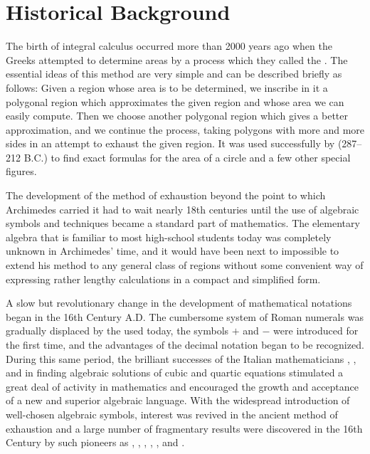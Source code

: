 \section{Historical Background}\label{0:sec:1.2}

\begin{note}
  The birth of integral calculus occurred more than 2000 years ago when the Greeks attempted to determine areas by a process which they called the \textbf{}.
  The essential ideas of this method are very simple and can be described briefly as follows:
  Given a region whose area is to be determined, we inscribe in it a polygonal region which approximates the given region and whose area we can easily compute.
  Then we choose another polygonal region which gives a better approximation, and we continue the process, taking polygons with more and more sides in an attempt to exhaust the given region.
  It was used successfully by  (287--212 B.C.) to find exact formulas for the area of a circle and a few other special figures.

  The development of the method of exhaustion beyond the point to which Archimedes carried it had to wait nearly 18th centuries until the use of algebraic symbols and techniques became a standard part of mathematics.
  The elementary algebra that is familiar to most high-school students today was completely unknown in Archimedes' time, and it would have been next to impossible to extend his method to any general class of regions without some convenient way of expressing rather lengthy calculations in a compact and simplified form.

  A slow but revolutionary change in the development of mathematical notations began in the 16th Century A.D.
  The cumbersome system of Roman numerals was gradually displaced by the  used today, the symbols \(+\) and \(-\) were introduced for the first time, and the advantages of the decimal notation began to be recognized.
  During this same period, the brilliant successes of the Italian mathematicians , , and  in finding algebraic solutions of cubic and quartic equations stimulated a great deal of activity in mathematics and encouraged the growth and acceptance of a new and superior algebraic language.
  With the widespread introduction of well-chosen algebraic symbols, interest was revived in the ancient method of exhaustion and a large number of fragmentary results were discovered in the 16th Century by such pioneers as , , , , , and .


\end{note}
